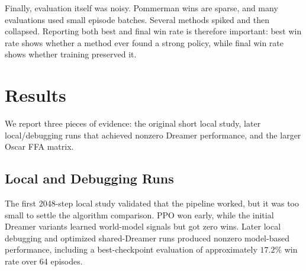 \documentclass[11pt]{article}
\begin{document}
Finally, evaluation itself was noisy. Pommerman wins are sparse, and many evaluations used small episode batches. Several methods spiked and then collapsed. Reporting both best and final win rate is therefore important: best win rate shows whether a method ever found a strong policy, while final win rate shows whether training preserved it.

\section{Results}

We report three pieces of evidence: the original short local study, later local/debugging runs that achieved nonzero Dreamer performance, and the larger Oscar FFA matrix.

\subsection{Local and Debugging Runs}

The first 2048-step local study validated that the pipeline worked, but it was too small to settle the algorithm comparison. PPO won early, while the initial Dreamer variants learned world-model signals but got zero wins. Later local debugging and optimized shared-Dreamer runs produced nonzero model-based performance, including a best-checkpoint evaluation of approximately $17.2\%$ win rate over 64 episodes.

\begin{table}[H]
\centering
{}
\caption{Local and debugging-stage results. The original 2048-step study favored PPO, but later optimized shared-Dreamer runs showed nonzero model-based control before the full Oscar matrix.}
\label{tab:local-results}
\end{table}
\end{document}
